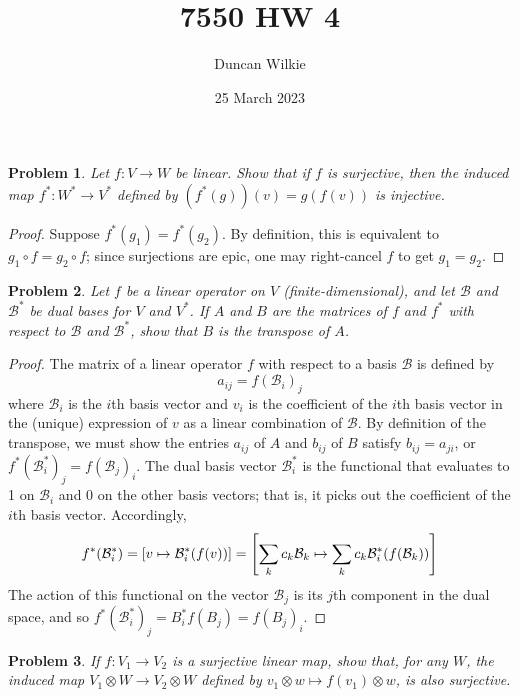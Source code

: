 \documentclass{article}
\title{7550 HW 4}
\author{Duncan Wilkie}
\date{25 March 2023}
\newtheorem{plm}{Problem}
\begin{document}
\maketitle

\begin{plm}
  Let $f: V \to W$ be linear.
  Show that if $f$ is surjective, then the induced map $f^{*}: W^{*} \to V^{*}$ defined by $(f^{*}(g))(v) = g(f(v))$ is injective.
\end{plm}

\begin{proof}
  Suppose $f^{*}(g_{1}) = f^{*}(g_{2})$.
  By definition, this is equivalent to $g_{1} \circ f = g_{2} \circ f$; since surjections are epic, one may right-cancel $f$
  to get $g_{1} = g_{2}$.
\end{proof}


\begin{plm}
  Let $f$ be a linear operator on $V$ (finite-dimensional), and let $\mathcal{B}$ and $\mathcal{B}^{*}$ be dual bases for $V$ and $V^{*}$.
  If $A$ and $B$ are the matrices of $f$ and $f^{*}$ with respect to $\mathcal{B}$ and $\mathcal{B}^{*}$,
  show that $B$ is the transpose of $A$.
\end{plm}

\begin{proof}
  The matrix of a linear operator $f$ with respect to a basis $\mathcal{B}$ is defined by
  \[
    a_{ij} = f(\mathcal{B}_{i})_{j}
  \]
  where $\mathcal{B}_{i}$ is the $i$th basis vector and $v_{i}$ is the coefficient of the $i$th basis vector in the (unique) expression of $v$
  as a linear combination of $\mathcal{B}$.
  By definition of the transpose, we must show the entries $a_{ij}$ of $A$ and $b_{ij}$ of $B$ satisfy $b_{ij} = a_{ji}$,
  or $f^{*}(\mathcal{B}^{*}_{i})_{j} = f(\mathcal{B}_{j})_{i}$.
  The dual basis vector $\mathcal{B}^{*}_{i}$ is the functional that evaluates to 1 on $\mathcal{B}_{i}$ and 0 on the other basis vectors;
  that is, it picks out the coefficient of the $i$th basis vector.
  Accordingly,
  \[
    f^{*}(\mathcal{B}^{*}_{i}) = \qty[v \mapsto \mathcal{B}^{*}_{i}(f(v))]
    = \qty[\sum_{k}c_{k}\mathcal{B}_{k} \mapsto \sum_{k}c_{k}\mathcal{B}^{*}_{i}(f(\mathcal{B}_{k}))]
  \]
  The action of this functional on the vector $\mathcal{B}_{j}$ is its $j$th component in the dual space,
  and so $f^{*}(\mathcal{B}_{i}^{*})_{j} = B_{i}^{*}f(B_{j}) = f(B_{j})_{i}$.
\end{proof}

\begin{plm}
  If $f: V_{1} \to V_{2}$ is a surjective linear map, show that, for any $W$, the induced map $V_{1} \otimes W \to V_{2} \otimes W$
  defined by $v_{1} \otimes w \mapsto f(v_{1}) \otimes w$, is also surjective.
\end{plm}
\end{document}
